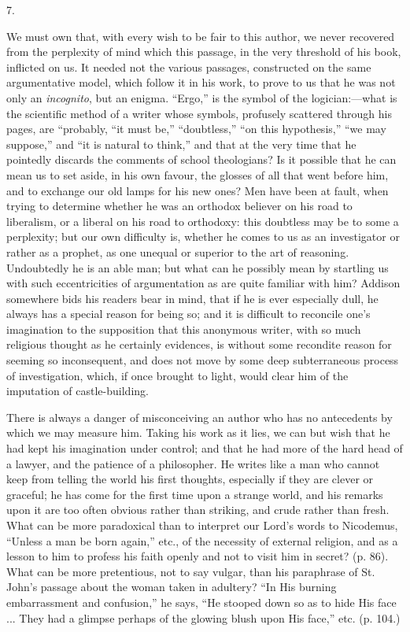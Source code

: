 7.

We must own that, with every wish to be fair to
this author, we never recovered from the perplexity of mind which this
passage, in the very threshold of his book, inflicted on us. It needed
not the various passages, constructed on the same argumentative model,
which follow it in his work, to prove to us that he was not only an \emph{incognito},
but an enigma. ``Ergo,'' is the symbol of the logician:—what is the
scientific method of a writer whose symbols, profusely scattered
through his pages, are ``probably, ``it must be,'' ``doubtless,'' ``on this
hypothesis,'' ``we may suppose,'' and ``it is natural to think,'' and that
at the very time that he pointedly discards the comments of school
theologians? Is it possible that he can mean us to set aside, in his
own favour, the glosses of all that went before him, and to exchange
our old lamps for his new ones? Men have been at fault, when trying to
determine whether he was an orthodox believer on his road to
liberalism, or a liberal on his road to orthodoxy: this doubtless may
be to some a perplexity; but our own difficulty is, whether he comes
to us as an investigator or rather as a prophet, as one unequal or
superior to the art of reasoning. Undoubtedly he is an able man; but
what can he possibly mean by startling us with such eccentricities of
argumentation as are quite familiar with him? Addison somewhere bids
his readers bear in mind, that if he is ever especially dull, he
always has a special reason for being so; and it is difficult to
reconcile one's imagination to the supposition that this anonymous
writer, with so much religious thought as he certainly evidences, is
without some recondite reason for seeming so inconsequent, and does
not move by some deep subterraneous process of investigation, which,
if once brought to light, would clear him of the imputation of
castle-building.

There is always a danger of misconceiving an
author who has no antecedents by which we may measure him. Taking his
work as it lies, we can but wish that he had kept his imagination
under control; and that he had more of the hard head of a lawyer, and
the patience of a philosopher. He writes like a man who cannot keep
from telling the world his first thoughts, especially if they are
clever or graceful; he has come for the first time upon a strange
world, and his remarks upon it are too often obvious rather than
striking, and crude rather than fresh. What can be more paradoxical
than to interpret our Lord's words to Nicodemus, ``Unless a man be born
again,'' etc., of the necessity of external religion, and as a lesson
to him to profess his faith openly and not to visit him in secret? (p.
86). What can be more pretentious, not to say vulgar, than his
paraphrase of St. John's passage about the woman taken in adultery? ``In
His burning embarrassment and confusion,'' he says, ``He stooped down so
as to hide His face ... They had a glimpse perhaps of the glowing
blush upon His face,'' etc. (p. 104.)

